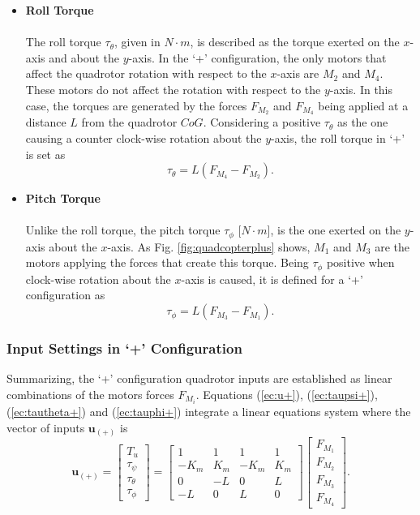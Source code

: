 \begin{itemize}
\item \textbf{Roll Torque}\\\\
The roll torque $\tau_\theta$, given in $N\cdot m$, is described as the torque exerted on the $x$-axis and about the $y$-axis. In the `+' configuration, the only motors that affect the quadrotor rotation with respect to the $x$-axis are $M_2$ and $M_4$. These motors do not affect the rotation with respect to the $y$-axis. In this case, the torques are generated by the forces $F_{M_2}$ and $F_{M_4}$ being applied at a distance $L$ from the quadrotor $CoG$. Considering a positive $\tau_\theta$ as the one causing a counter clock-wise rotation about the $y$-axis, the roll torque in `+' is set as
\begin{equation}
\label{ec:tautheta+}
\tau_{\theta} = L(F_{M_4}-F_{M_2}).
\end{equation}

\item \textbf{Pitch Torque}\\\\
Unlike the roll torque, the pitch torque $\tau_\phi$ [$N\cdot m$], is the one exerted on the $y$-axis about the $x$-axis. As Fig. \ref{fig:quadcopterplus} shows, $M_1$ and $M_3$ are the motors applying the forces that create this torque. Being $\tau_\phi$ positive when clock-wise rotation about the $x$-axis is caused, it is defined for a `+' configuration as
\begin{equation}
\label{ec:tauphi+}
\tau_{\phi} = L(F_{M_3}-F_{M_1}).
\end{equation}
\end{itemize}

\subsubsection{Input Settings in `+' Configuration}
Summarizing, the `+' configuration quadrotor inputs are established as linear combinations of the motors forces $F_{M_i}$. Equations (\ref{ec:u+}), (\ref{ec:taupsi+}), (\ref{ec:tautheta+}) and (\ref{ec:tauphi+}) integrate a linear equations system where the vector of inputs $\mathbf{u_{(+)}}$ is
\begin{equation}
	\mathbf{u_{(+)}} = \begin{bmatrix}
	T_u\\[5pt]
	\tau_{\psi}\\[5pt]
	\tau_{\theta}\\[5pt]
	\tau_{\phi}
	\end{bmatrix} = \begin{bmatrix}
	1 & 1 & 1 & 1 \\[5pt]
	-K_{m} & K_{m} & -K_{m} & K_{m}\\[5pt]
	0 & -L & 0 & L\\[5pt]
	-L & 0 & L & 0
							\end{bmatrix}
\begin{bmatrix}
F_{M_1}\\[5pt]
F_{M_2}\\[5pt]
F_{M_3}\\[5pt]
F_{M_4}
\end{bmatrix}.
	\label{ec:U_+}						
\end{equation}


